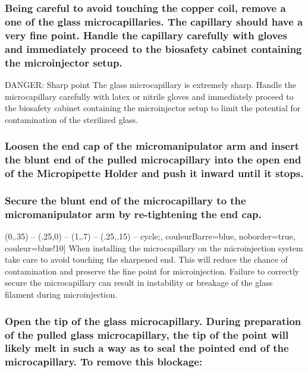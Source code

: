 \documentclass[11pt]{article}
\newcommand\dangersign[1][4ex]{\renewcommand\stacktype{L}\scaleto{\stackon[1pt]{\color{red}$\triangle$}{\tiny !}}{#1}}
\def\checkmark{\tikz\fill[scale=0.3](0,.35) -- (.25,0) -- (1,.7) -- (.25,.15) -- cycle;}
\begin{document}
\subsubsection{{\sffamily } Being careful to avoid touching the copper coil, remove a one of the glass microcapillaries. The capillary should have a very fine point. Handle the capillary carefully with gloves and immediately proceed to the biosafety cabinet containing the microinjector setup. \\}
\label{sec:orgheadline30}
\begin{bclogo}[logo=\dangersign, couleurBarre=red, noborder=true, couleur=yellow!20]{     DANGER: Sharp point}
The glass microcapillary is extremely sharp. Handle the microcapillary carefully with latex or nitrile gloves and immediately proceed to the biosafety cabinet containing the microinjector setup to limit the potential for contamination of the sterilized glass.\\
\end{bclogo}
\subsubsection{{\sffamily } Loosen the end cap of the micromanipulator arm and insert the blunt end of the pulled microcapillary into the open end of the Micropipette Holder and push it inward until it stops.}
\label{sec:orgheadline31}
\subsubsection{{\sffamily } Secure the blunt end of the microcapillary to the micromanipulator arm by re-tightening the end cap.}
\label{sec:orgheadline32}

\begin{bclogo}[logo=\checkmark, couleurBarre=blue, noborder=true, couleur=blue!10]{}
When installing the microcapillary  on the microinjection system take care to avoid touching the sharpened end. This will reduce the chance of contamination and preserve the fine point for microinjection. Failure to correctly secure the microcapillary can result in instability or breakage of the glass filament during microinjection.\\
\end{bclogo}

\subsubsection{{\sffamily } Open the tip of the glass microcapillary. During preparation of the pulled glass microcapillary,  the tip of the point will likely melt in such a way as to seal the pointed end of the microcapillary. To remove this blockage:}
\label{sec:orgheadline39}
\end{document}
